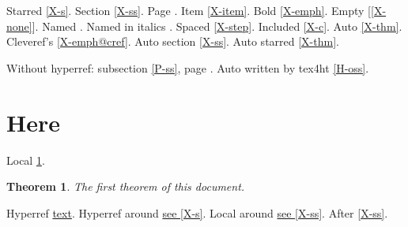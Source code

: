\documentclass{article}
\newtheorem{theorem}{Theorem}
\begin{document}
Starred \ref*{X-s}. Section \ref{X-ss}. Page \pageref{X-front}.
Item \ref{X-item}. Bold \ref{X-emph}. Empty [\ref{X-none}].
Named . Named in italics .
Spaced \ref{X-step}. Included \ref{X-c}.
Auto \autoref{X-thm}. Cleveref's \ref{X-emph@cref}.
Auto section \autoref{X-ss}. Auto starred \autoref*{X-thm}.

Without hyperref: subsection \ref{P-ss}, page \pageref{P-front}.
Auto written by tex4ht \autoref{H-oss}.

\section{Here}\label{here}
Local \ref{here}.

\begin{theorem}
The first theorem of this document.
\end{theorem}

Hyperref \hyperref[X-ss]{text}.
Hyperref around \hyperref[X-ss]{see \ref{X-s}}.
Local around \hyperref[here]{see \ref{X-ss}}.
After \ref{X-ss}.
\end{document}
